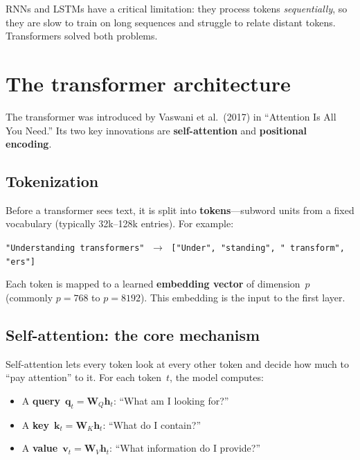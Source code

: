 \documentclass[11pt, twoside, openright]{memoir}
\begin{document}
RNNs and LSTMs have a critical limitation: they process tokens
\emph{sequentially}, so they are slow to train on long sequences and
struggle to relate distant tokens.  Transformers solved both problems.

\section{The transformer architecture}

The transformer was introduced by Vaswani et al.\ (2017) in ``Attention Is
All You Need.''  Its two key innovations are \textbf{self-attention} and
\textbf{positional encoding}.

\subsection{Tokenization}

Before a transformer sees text, it is split into \textbf{tokens}---subword
units from a fixed vocabulary (typically 32k--128k entries).  For example:

\begin{center}\small
\texttt{"Understanding transformers"} $\;\to\;$
\texttt{["Under", "standing", " transform", "ers"]}
\end{center}

Each token is mapped to a learned \textbf{embedding vector} of dimension~$p$
(commonly $p = 768$ to $p = 8192$).  This embedding is the input to the
first layer.

\subsection{Self-attention: the core mechanism}

Self-attention lets every token look at every other token and decide how
much to ``pay attention'' to it.  For each token~$t$, the model computes:
\begin{itemize}[nosep]
\item A \textbf{query}~$\mathbf{q}_t = \mathbf{W}_Q \mathbf{h}_t$:
  ``What am I looking for?''
\item A \textbf{key}~$\mathbf{k}_t = \mathbf{W}_K \mathbf{h}_t$:
  ``What do I contain?''
\item A \textbf{value}~$\mathbf{v}_t = \mathbf{W}_V \mathbf{h}_t$:
  ``What information do I provide?''
\end{itemize}
\end{document}

